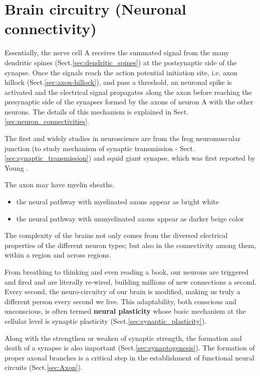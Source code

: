 \chapter{Brain circuitry (Neuronal connectivity)}
\label{chap:brain_circuitry}

Essentially, the nerve cell A receives the summated signal from the many
dendritic spines (Sect.\ref{sec:dendritic_spines}) at the postsynaptic side of
the synapse. Once the signals reach the action potential initiation site, i.e.
axon hillock (Sect.\ref{sec:axon-hillock}), and pass a threshold, an neuronal
spike is activated and the electrical signal propagates along the axon before
reaching the presynaptic side of the synapses formed by the axons of neuron A
with the other neurons. The details of this mechanism is explained in
Sect.\ref{sec:neuron_connectivities}.

The first and widely studies in neuroscience are from the frog neuromuscular
junction (to study mechanism of synaptic transmission -
Sect.\ref{sec:synaptic_transmission}) and squid giant synapse, which was first
reported by Young \cite{young1936}.

The axon may have myelin sheaths.
\begin{itemize}
  \item the neural pathway with myelinated axons appear as bright white
  \item the neural pathway with unmyelinated axons appear as darker beige color
\end{itemize}

The complexity of the brains not only comes from the diversed
electrical properties of the different neuron types; but also in the
connectivity among them, within a region and across regions.

From breathing to thinking and even reading a book, our neurons are triggered
and fired and are literally re-wired, building millions of new connections a
second. Every second, the neuro-circuitry of our brain is modified, making us
truly a different person every second we live.
This adaptability, both conscious and unconscious, is often termed {\bf
neural plasticity} whose basic mechanism at
the cellular level is synaptic plasticity (Sect.\ref{sec:synaptic_plasticity}).

Along with the strengthen or weaken of synaptic strength, the formation and
death of a synapse is also important (Sect.\ref{sec:synaptogenesis}).
The formation of proper axonal branches is a critical step in the
establishment of functional neural circuits (Sect.\ref{sec:Axon}).

